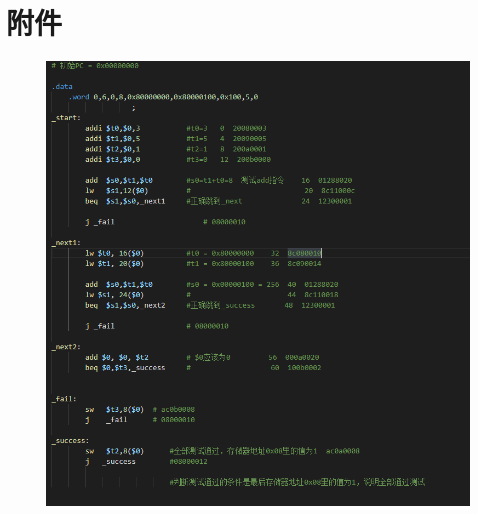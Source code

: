 \documentclass[UTF8]{article}
\begin{document}
\section{附件}
\begin{figure}[H]
	\centering
	\includegraphics[width=\linewidth]{sim_asm.png}
\end{figure}
\end{document}
